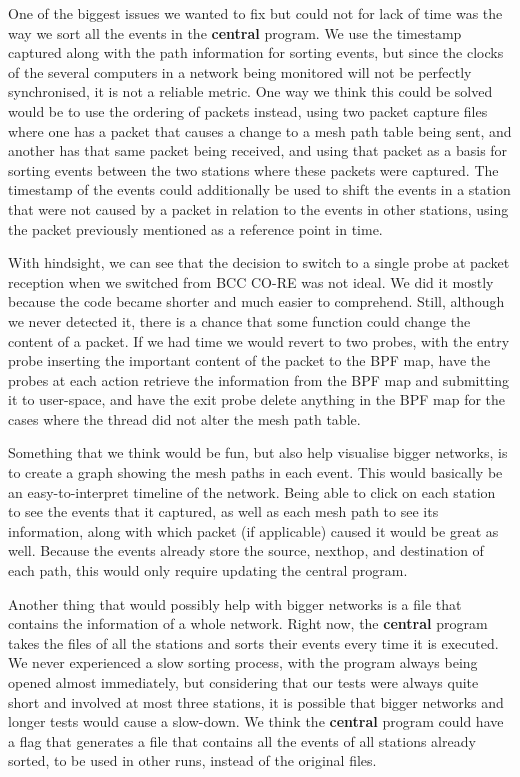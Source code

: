 One of the biggest issues we wanted to fix but could not for lack of time was
the way we sort all the events in the \textbf{central} program. We use the
timestamp captured along with the path information for sorting events, but since
the clocks of the several computers in a network being monitored will not be
perfectly synchronised, it is not a reliable metric. One way we think this could
be solved would be to use the ordering of packets instead, using two packet
capture files where one has a packet that causes a change to a mesh path table
being sent, and another has that same packet being received, and using that
packet as a basis for sorting events between the two stations where these
packets were captured. The timestamp of the events could additionally be used to
shift the events in a station that were not caused by a packet in relation to
the events in other stations, using the packet previously mentioned as a
reference point in time.

With hindsight, we can see that the decision to switch to a single probe at
packet reception when we switched from \ac{BCC} \ac{CO-RE} was not ideal. We did
it mostly because the code became shorter and much easier to comprehend. Still,
although we never detected it, there is a chance that some function could change
the content of a packet. If we had time we would revert to two probes, with the
entry probe inserting the important content of the packet to the BPF map, have
the probes at each action retrieve the information from the BPF map and
submitting it to user-space, and have the exit probe delete anything in the BPF
map for the cases where the thread did not alter the mesh path table.

Something that we think would be fun, but also help visualise bigger networks,
is to create a graph showing the mesh paths in each event. This would basically
be an easy-to-interpret timeline of the network. Being able to click on each
station to see the events that it captured, as well as each mesh path to see its
information, along with which packet (if applicable) caused it would be great as
well. Because the events already store the source, nexthop, and destination of
each path, this would only require updating the central program.

Another thing that would possibly help with bigger networks is a file that
contains the information of a whole network. Right now, the \textbf{central}
program takes the files of all the stations and sorts their events every time it
is executed. We never experienced a slow sorting process, with the program
always being opened almost immediately, but considering that our tests were
always quite short and involved at most three stations, it is possible that
bigger networks and longer tests would cause a slow-down. We think the
\textbf{central} program could have a flag that generates a file that contains
all the events of all stations already sorted, to be used in other runs, instead
of the original files.

